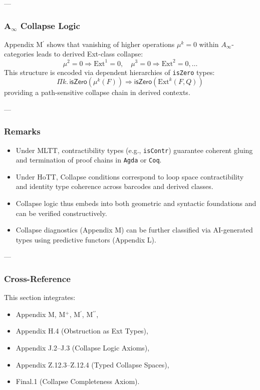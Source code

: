 \documentclass[11pt]{article}
\begin{document}
\begin{axiom}
\begin{axiom}
{{---

\subsubsection*{A$_\infty$ Collapse Logic}

Appendix M$^\prime$ shows that vanishing of higher operations \(\mu^k = 0\)  
within \( A_\infty \)-categories leads to derived Ext-class collapse:
\[
\mu^2 = 0 \Rightarrow \mathrm{Ext}^1 = 0, \quad \mu^3 = 0 \Rightarrow \mathrm{Ext}^2 = 0, \dots
\]
This structure is encoded via dependent hierarchies of \texttt{isZero} types:
\[
\Pi k.\, \mathsf{isZero}(\mu^k(F)) \Rightarrow \mathsf{isZero}(\mathrm{Ext}^k(F, Q))
\]
providing a path-sensitive collapse chain in derived contexts.

---

\subsubsection*{Remarks}

\begin{itemize}
  \item Under MLTT, contractibility types (e.g., \texttt{isContr}) guarantee coherent gluing  
  and termination of proof chains in \texttt{Agda} or \texttt{Coq}.

  \item Under HoTT, Collapse conditions correspond to loop space contractibility  
  and identity type coherence across barcodes and derived classes.

  \item Collapse logic thus embeds into both geometric and syntactic foundations  
  and can be verified constructively.

  \item Collapse diagnostics (Appendix M) can be further classified via AI-generated types  
  using predictive functors (Appendix L).
\end{itemize}

---

\subsubsection*{Cross-Reference}

This section integrates:
\begin{itemize}
  \item Appendix M, M$^+$, M$^\prime$, M$^{\prime\prime}$,
  \item Appendix H.4 (Obstruction as Ext Types),
  \item Appendix J.2–J.3 (Collapse Logic Axioms),
  \item Appendix Z.12.3–Z.12.4 (Typed Collapse Spaces),
  \item Final.1 (Collapse Completeness Axiom).
\end{itemize}

}}
\end{axiom}
\end{axiom}
\end{document}

